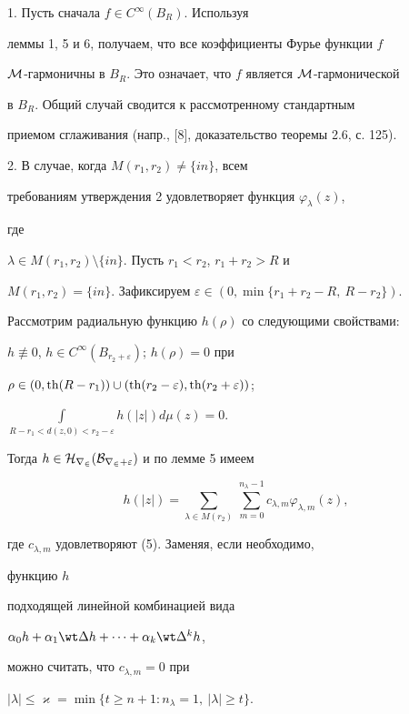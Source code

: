  


1. Пусть сначала $f\in C^\infty(B_R)$. Используя 


леммы 1, 5 и 6, получаем, что все коэффициенты Фурье функции $f$\; 


$\cal M$-гармоничны в $B_R$. Это означает, что $f$ является $\cal 


M$-гармонической 


в $B_R$. Общий случай сводится к рассмотренному стандартным 


приемом сглаживания (напр., [8], доказательство теоремы 2.6, с. 125). 


 


2. В случае, когда $M(r_1,r_2)\ne\{in\}$, всем 


требованиям утверждения 2 удовлетворяет функция $\varphi_\lambda(z)$, 


где 


$\lambda\in M(r_1,r_2)\setminus\{in\}$. Пусть $r_1<r_2$, $r_1+r_2>R$ и 


$M(r_1,r_2)=\{in\}$. Зафиксируем $\varepsilon\in(0,\min\{r_1+r_2-R,\ 


R-r_2\})$. 


Рассмотрим радиальную функцию $h(\rho)$ со следующими свойствами: 


$h\not\equiv0$, $h\in C^\infty(B_{r_2+\varepsilon})$; $h(\rho)=0$ при 


$\rho\in(0,\th(R-r_1))\cup(\th(r_2-\varepsilon), 


\th(r_2+\varepsilon))$; 


$\int\limits_{R-r_1<d(z,0)<r_2-\varepsilon}h(|z|)d\mu(z)=0$. 


Тогда $h\in\cal H_{r_2}(B_{r_2+\varepsilon})$ и по лемме 5 имеем 


$$ 


h(|z|)=\sum_{\lambda\in M(r_2)}\, 


\sum^{n_\lambda-1}_{m=0}c_{\lambda,m} 


\varphi_{\lambda,m}(z), 


$$ 


где $c_{\lambda,m}$ удовлетворяют (5). Заменяя, если необходимо, 


функцию $h$ 


подходящей линейной комбинацией вида 


$\alpha_0h+\alpha_1\wt\Delta h+\dotsb+\alpha_k\wt\Delta^k h$, 


можно считать, что $c_{\lambda,m}=0$ при 


$|\lambda|\le\varkappa=\min\{t\ge n+1:n_\lambda=1,\ |\lambda|\ge t\}$. 


